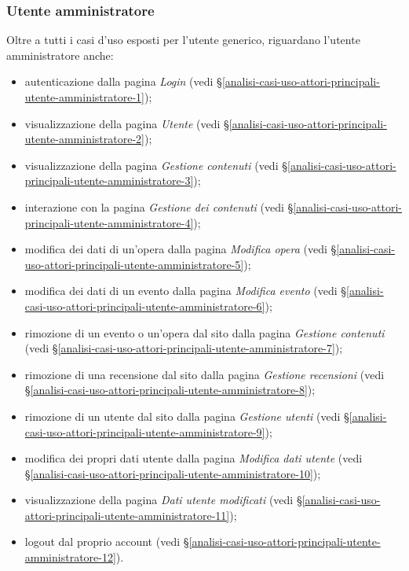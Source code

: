 \subsubsection{Utente amministratore}
\label{analisi-casi-uso-attori-principali-utente-amministratore}
Oltre a tutti i casi d'uso esposti per l'utente generico, riguardano l'utente amministratore anche:
\begin{itemize}
	\item autenticazione dalla pagina \textit{Login} (vedi §\ref{analisi-casi-uso-attori-principali-utente-amministratore-1});
	\item visualizzazione della pagina \textit{Utente} (vedi §\ref{analisi-casi-uso-attori-principali-utente-amministratore-2});
	\item visualizzazione della pagina \textit{Gestione contenuti} (vedi §\ref{analisi-casi-uso-attori-principali-utente-amministratore-3});
	\item interazione con la pagina \textit{Gestione dei contenuti} (vedi §\ref{analisi-casi-uso-attori-principali-utente-amministratore-4});
	\item modifica dei dati di un'opera dalla pagina \textit{Modifica opera} (vedi §\ref{analisi-casi-uso-attori-principali-utente-amministratore-5});
	\item modifica dei dati di un evento dalla pagina \textit{Modifica evento} (vedi §\ref{analisi-casi-uso-attori-principali-utente-amministratore-6});
	\item rimozione di un evento o un'opera dal sito dalla pagina \textit{Gestione contenuti} (vedi §\ref{analisi-casi-uso-attori-principali-utente-amministratore-7});
	\item rimozione di una recensione dal sito dalla pagina \textit{Gestione recensioni} (vedi §\ref{analisi-casi-uso-attori-principali-utente-amministratore-8});
	\item rimozione di un utente dal sito dalla pagina \textit{Gestione utenti} (vedi §\ref{analisi-casi-uso-attori-principali-utente-amministratore-9});
	\item modifica dei propri dati utente dalla pagina \textit{Modifica dati utente} (vedi §\ref{analisi-casi-uso-attori-principali-utente-amministratore-10});
	\item visualizzazione della pagina \textit{Dati utente modificati} (vedi §\ref{analisi-casi-uso-attori-principali-utente-amministratore-11});
	\item logout dal proprio account (vedi §\ref{analisi-casi-uso-attori-principali-utente-amministratore-12}).
\end{itemize}

